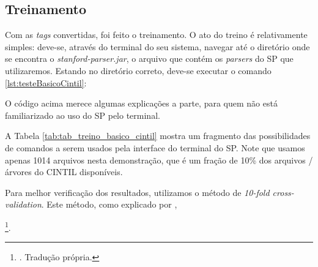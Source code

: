 \begin{center}
    
\end{center}

\subsection{Treinamento}
\label{subsec:treinamento_cintil}


Com as \textit{tags} convertidas, foi feito o treinamento. O ato do treino é relativamente simples: deve-se, através do terminal do seu sistema, navegar até o diretório onde se encontra o \textit{stanford-parser.jar}, o arquivo que contém os \textit{parsers} do SP que utilizaremos. Estando no diretório correto, deve-se executar o comando \ref{lst:testeBasicoCintil}:

\begin{center}

\end{center}

O código acima merece algumas explicações a parte, para quem não está familiarizado ao uso do SP pelo terminal.

\begin{center}

\end{center}

A Tabela \ref{tab:tab_treino_basico_cintil} mostra um fragmento das possibilidades de comandos a serem usados pela interface do terminal do SP. Note que usamos apenas 1014 arquivos nesta demonstração, que é um fração de 10\% dos arquivos / árvores do CINTIL disponíveis.

Para melhor verificação dos resultados, utilizamos o método de \textit{10-fold cross-validation}. Este método, como explicado por ,
\begin{displayquote}
    \footnote{. Tradução própria.}.
\end{displayquote}


